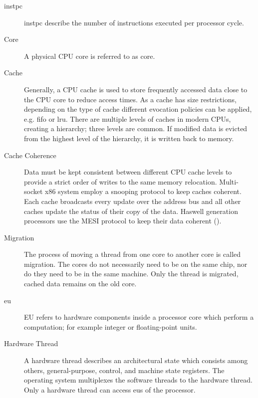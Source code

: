 \begin{description}
  \item[\Gls{instpc}] \Gls{instpc} describe the number of instructions executed
    per processor cycle.


  \item[Core] A physical CPU core is referred to as core.

  \item[Cache] Generally, a CPU cache is used to store frequently accessed data
    close to the CPU core to reduce access times.
    As a cache has size restrictions, depending on the type of cache different
    evocation policies can be applied, e.g. \gls{fifo} or \gls{lru}.
    There are multiple levels of caches in modern CPUs, creating a hierarchy;
    three levels are common.
    If modified data is evicted from the highest level of the hierarchy, it is
    written back to memory.

  \item[Cache Coherence] Data must be kept consistent between different CPU
    cache levels to provide a strict order of writes to the same memory
    relocation.
    Multi-socket x86 system employ a snooping protocol to keep caches coherent.
    Each cache broadcasts every update over the address bus and all other
    caches update the status of their copy of the data.
    Haswell generation processors use the MESI protocol to keep their data
    coherent (\autocite[2-22]{intel_optimization_manual_2015}).

  \item[Migration] The process of moving a thread from one core to another core
    is called migration.
    The cores do not necessarily need to be on the same chip, nor do they need
    to be in the same machine. Only the thread is migrated, cached data remains
    on the old core.

  \item[\Gls{eu}] EU refers to hardware components inside a
    processor core which perform a computation; for example integer or
    floating-point units.

  \item[Hardware Thread] A hardware thread describes an architectural state
    which consists among others, general-purpose, control, and machine state
    registers.
    The operating system multiplexes the software threads to the hardware
    thread.
    Only a hardware thread can access \gls{eu}s of the processor.


\end{description}
